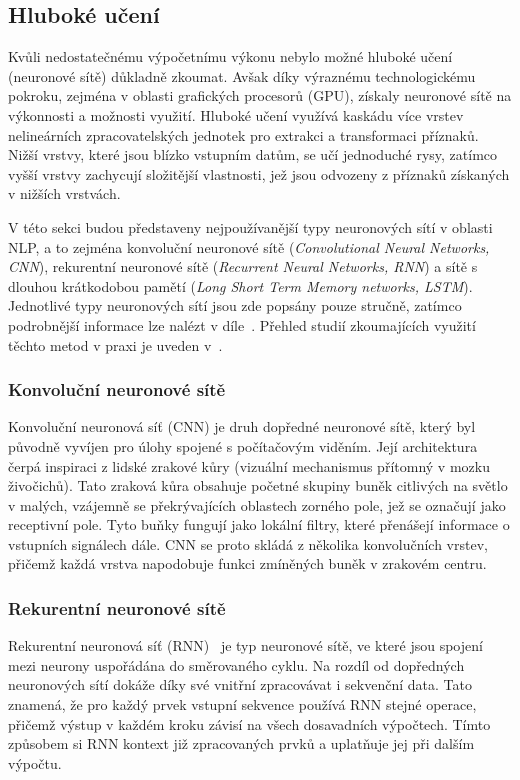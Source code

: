 \subsection{Hluboké učení}
Kvůli nedostatečnému výpočetnímu výkonu nebylo možné hluboké učení (neuronové sítě) důkladně zkoumat. Avšak díky výraznému technologickému pokroku, zejména v oblasti grafických procesorů (GPU), získaly neuronové sítě na výkonnosti a možnosti využití. Hluboké učení využívá kaskádu více vrstev nelineárních zpracovatelských jednotek pro extrakci a transformaci příznaků. Nižší vrstvy, které jsou blízko vstupním datům, se učí jednoduché rysy, zatímco vyšší vrstvy zachycují složitější vlastnosti, jež jsou odvozeny z příznaků získaných v nižších vrstvách.~\cite{zhang2018deeplearningsentimentanalysis}

V této sekci budou představeny nejpoužívanější typy neuronových sítí v oblasti NLP, a to zejména konvoluční neuronové sítě (\emph{Convolutional Neural Networks, CNN}), rekurentní neuronové sítě (\emph{Recurrent Neural Networks, RNN}) a sítě s dlouhou krátkodobou pamětí (\emph{Long Short Term Memory networks, LSTM}). Jednotlivé typy neuronových sítí jsou zde popsány pouze stručně, zatímco podrobnější informace lze nalézt v díle~\cite{zhang2018deeplearningsentimentanalysis}. Přehled studií zkoumajících využití těchto metod v praxi je uveden v~\cite{SuryawanshiSA}.

\subsubsection{Konvoluční neuronové sítě}
Konvoluční neuronová síť (CNN) je druh dopředné neuronové sítě, který byl původně vyvíjen pro úlohy spojené s počítačovým viděním. Její architektura čerpá inspiraci z lidské zrakové kůry (vizuální mechanismus přítomný v mozku živočichů). Tato zraková kůra obsahuje početné skupiny buněk citlivých na světlo v malých, vzájemně se překrývajících oblastech zorného pole, jež se označují jako receptivní pole. Tyto buňky fungují jako lokální filtry, které přenášejí informace o vstupních signálech dále. CNN se proto skládá z několika konvolučních vrstev, přičemž každá vrstva napodobuje funkci zmíněných buněk v zrakovém centru.~\cite{zhang2018deeplearningsentimentanalysis}

\subsubsection{Rekurentní neuronové sítě}
Rekurentní neuronová síť (RNN)~\cite{RNNbib} je typ neuronové sítě, ve které jsou spojení mezi neurony uspořádána do směrovaného cyklu. Na rozdíl od dopředných neuronových sítí dokáže díky své vnitřní   zpracovávat i sekvenční data. Tato   znamená, že pro každý prvek vstupní sekvence používá RNN stejné operace, přičemž výstup v každém kroku závisí na všech dosavadních výpočtech. Tímto způsobem si RNN   kontext již zpracovaných prvků a uplatňuje jej při dalším výpočtu.~\cite{zhang2018deeplearningsentimentanalysis}

